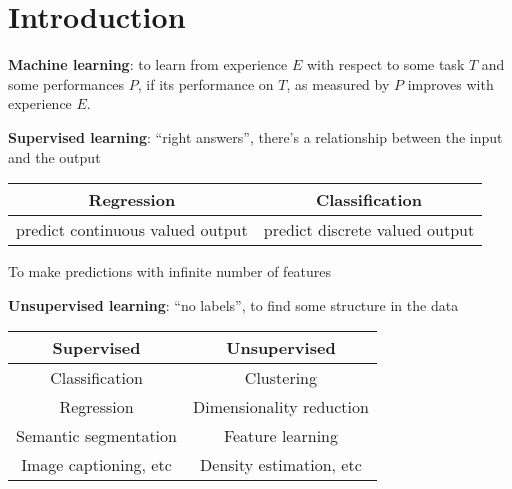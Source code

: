 




\pagestyle{scrheadings}
\clearscrheadfoot

\cfoot{\pagemark}



\section{Introduction}
\label{sec:introduction}	

\textbf{Machine learning}: to learn from experience $E$ with respect to some task $ T $ and some performances $P$, if its performance on $T$, as measured by $P$ improves with experience $E$. 

\textbf{Supervised learning}: “right answers”, there’s a relationship between the input and the output\\
\begin{center}
\begin{tabular}{c | c}
Regression &	Classification\\
\hline
predict continuous valued output  &  predict discrete valued output
\end{tabular}
\end{center}
To make predictions with infinite number of features

\textbf{Unsupervised learning}: “no labels”, to find some structure in the data

\begin{center}
\begin{tabular}{c | c}
Supervised  &	Unsupervised\\
\hline
Classification  &  Clustering\\
Regression     &  Dimensionality reduction\\
Semantic segmentation & Feature learning\\
Image captioning, etc    & Density estimation, etc\\
\hline
\end{tabular}
\end{center}

